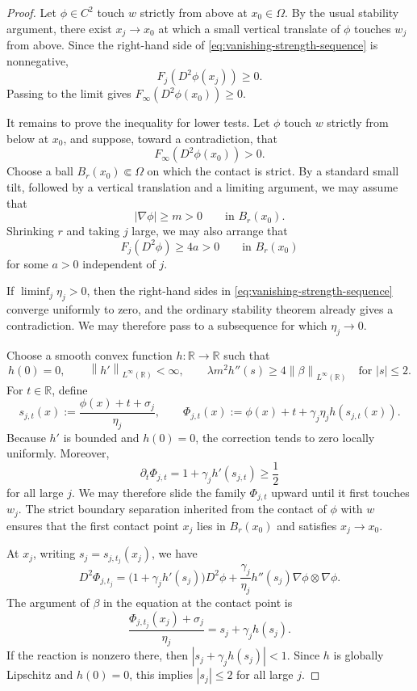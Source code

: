 \documentclass[11pt,letterpaper]{amsart}
\numberwithin{equation}{section}
\newcommand{\norm}[1]{\left\lVert #1\right\rVert}
\theoremstyle{definition}
\theoremstyle{remark}
\begin{document}
\begin{proof}
Let $\phi\in C^2$ touch $w$ strictly from above at $x_0\in\Omega$. By the
usual stability argument, there exist $x_j\to x_0$ at which a small vertical
translate of $\phi$ touches $w_j$ from above. Since the right-hand side of
\eqref{eq:vanishing-strength-sequence} is nonnegative,
$$
F_j(D^2\phi(x_j))\geq0.
$$
Passing to the limit gives
$F_\infty(D^2\phi(x_0))\geq0$.

It remains to prove the inequality for lower tests. Let $\phi$ touch $w$
strictly from below at $x_0$, and suppose, toward a contradiction, that
$$
F_\infty(D^2\phi(x_0))>0.
$$
Choose a ball $B_r(x_0)\Subset\Omega$ on which the contact is strict. By a
standard small tilt, followed by a vertical translation and a limiting
argument, we may assume that
\begin{equation}\label{eq:nonzero-test-gradient}
|\nabla\phi|\geq m>0
\qquad\text{in }B_r(x_0).
\end{equation}
Shrinking $r$ and taking $j$ large, we may also arrange that
\begin{equation}\label{eq:strict-test-operator}
F_j(D^2\phi)\geq4a>0
\qquad\text{in }B_r(x_0)
\end{equation}
for some $a>0$ independent of $j$.

If $\liminf_j\eta_j>0$, then the right-hand sides in
\eqref{eq:vanishing-strength-sequence} converge uniformly to zero, and the
ordinary stability theorem already gives a contradiction. We may therefore
pass to a subsequence for which $\eta_j\to0$.

Choose a smooth convex function $h:\mathbb R\to\mathbb R$ such that
$$
h(0)=0,
\qquad
\norm{h'}_{L^\infty(\mathbb R)}<\infty,
\qquad
\lambda m^2h''(s)
\geq
4\norm{\beta}_{L^\infty(\mathbb R)}
\quad\text{for }|s|\leq2.
$$
For $t\in\mathbb R$, define
$$
s_{j,t}(x)
:=
\frac{\phi(x)+t+\sigma_j}{\eta_j},
\qquad
\Phi_{j,t}(x)
:=
\phi(x)+t+\gamma_j\eta_jh(s_{j,t}(x)).
$$
Because $h'$ is bounded and $h(0)=0$, the correction tends to zero locally
uniformly. Moreover,
$$
\partial_t\Phi_{j,t}
=
1+\gamma_jh'(s_{j,t})
\geq\frac12
$$
for all large $j$. We may therefore slide the family $\Phi_{j,t}$ upward
until it first touches $w_j$. The strict boundary separation inherited from
the contact of $\phi$ with $w$ ensures that the first contact point
$x_j$ lies in $B_r(x_0)$ and satisfies $x_j\to x_0$.

At $x_j$, writing $s_j=s_{j,t_j}(x_j)$, we have
\begin{equation}\label{eq:corrected-test-hessian}
D^2\Phi_{j,t_j}
=
\bigl(1+\gamma_jh'(s_j)\bigr)D^2\phi
+
\frac{\gamma_j}{\eta_j}h''(s_j)
\nabla\phi\otimes\nabla\phi.
\end{equation}
The argument of $\beta$ in the equation at the contact point is
$$
\frac{\Phi_{j,t_j}(x_j)+\sigma_j}{\eta_j}
=
s_j+\gamma_jh(s_j).
$$
If the reaction is nonzero there, then
$|s_j+\gamma_jh(s_j)|<1$. Since $h$ is globally Lipschitz and $h(0)=0$,
this implies $|s_j|\leq2$ for all large $j$.


\end{proof}
\end{document}
